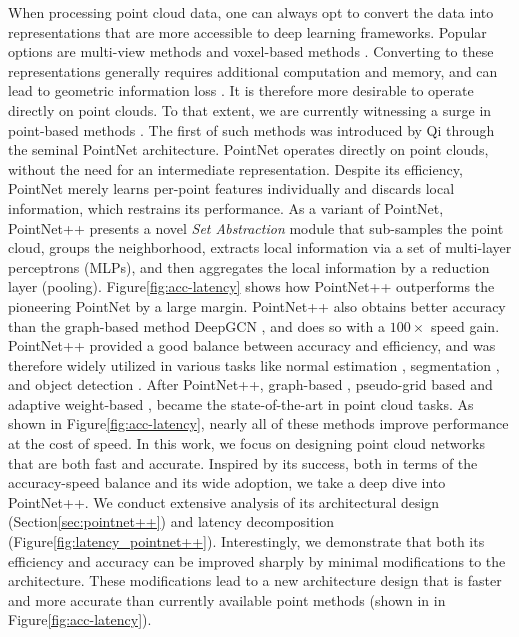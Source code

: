 \documentclass{article}
\newcommand{\figLabel}{Figure\xspace}
\newcommand{\secLabel}{Section\xspace}
\begin{document}
When processing point cloud data, one can always opt to convert the data into representations that are more accessible to deep learning frameworks. Popular options are multi-view methods \cite{Su2015MultiviewCN, Feng2018GVCNNGC, Wei2020ViewGCNVG} and voxel-based methods \cite{Graham20183DSS, Yan2018SECONDSE}. Converting to these representations generally requires additional computation and memory, and can lead to geometric information loss \cite{Liu2019PointVoxelCF}. It is therefore more desirable to operate directly on point clouds. To that extent, we are currently witnessing a surge in point-based methods \cite{Qi2017PointNetDL, Qi2017PointNetDH, dgcnn, Li2019DeepGCNs, Thomas2019KPConvFA, Liu2020ACL}.  
The first of such methods was introduced by Qi \etal through the seminal PointNet \cite{Qi2017PointNetDL} architecture. PointNet operates directly on point clouds, without the need for an intermediate representation. 
Despite its efficiency, PointNet merely learns per-point features individually and discards local information, which restrains its performance. 
As a variant of PointNet, PointNet++ \cite{Qi2017PointNetDH} presents a novel \textit{Set Abstraction} module that sub-samples the point cloud, groups the neighborhood, extracts local information via a set of multi-layer perceptrons (MLPs), and then aggregates the local information by a reduction layer (\ie pooling).  \figLabel \ref{fig:acc-latency} shows how PointNet++ outperforms the pioneering PointNet \cite{Qi2017PointNetDL} by a large margin. 
PointNet++ also obtains better accuracy than the graph-based method DeepGCN \cite{Li2019DeepGCNs}, and does so with a $100\times$ speed gain.
PointNet++ provided a good balance between accuracy and efficiency, and was therefore widely utilized in various tasks like normal estimation \cite{Guerrero2018PCPNetLL}, segmentation \cite{Qi2019DeepHV,Landrieu2018LargeScalePC}, and object detection \cite{Shi2019PointRCNN3O}.
After PointNet++, graph-based \cite{simonovsky2017dynamic, wang2019graph, dgcnn, Li2019DeepGCNs}, pseudo-grid based \cite{Tatarchenko2018TangentCF, PointCNN,mao2019interpolated,Thomas2019KPConvFA} and adaptive weight-based \cite{wang2018deep,Liu2019RelationShapeCN,accv2018/Groh, PointConv}, became the state-of-the-art in point cloud tasks. As shown in \figLabel \ref{fig:acc-latency}, nearly all of these methods improve performance at the cost of speed.
In this work, we focus on designing point cloud networks that are both fast and accurate. 
Inspired by its success, both in terms of the accuracy-speed balance and its wide adoption, we take a deep dive into PointNet++.
We conduct extensive analysis of its architectural design (\secLabel \ref{sec:pointnet++}) and latency decomposition (\figLabel \ref{fig:latency_pointnet++}). Interestingly, we demonstrate that both its efficiency and accuracy can be improved sharply by minimal modifications to the architecture. These modifications lead to a new architecture design that is faster and more accurate than currently available point methods (shown in \protect{}  in \figLabel \ref{fig:acc-latency}).
\end{document}
